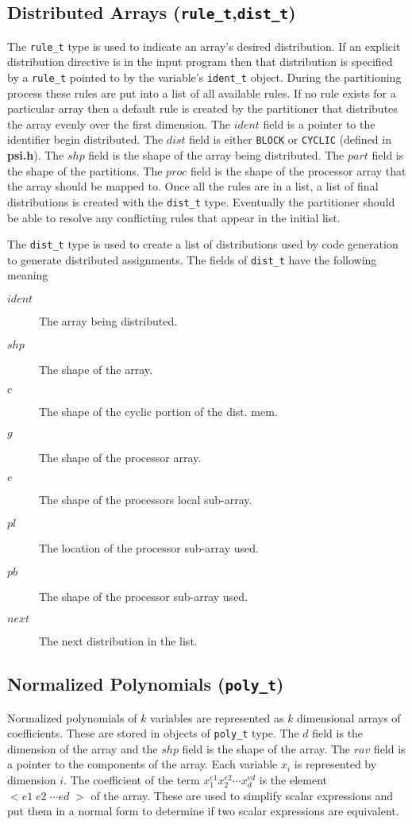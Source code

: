 \subsection{Distributed Arrays ({\tt rule\_t},{\tt dist\_t})}
The {\tt rule\_t} type is used to indicate an array's desired distribution.  If
an explicit distribution directive is in the input program then that 
distribution is specified by a {\tt rule\_t} pointed to by the variable's
{\tt ident\_t} object.  During the partitioning process these rules are put into
a list of all available rules.  If no rule exists for a particular array
then a default rule is created by the partitioner that distributes the 
array evenly over the first dimension.  The $ident$ field is a pointer
to the identifier begin distributed.  The $dist$ field is either {\tt BLOCK}
or {\tt CYCLIC} (defined in {\bf psi.h}).  The $shp$ field is the shape of the
array being distributed.  The $part$ field is the shape of the partitions.
The $proc$ field is the shape of the processor array that the array should
be mapped to.  Once all the rules are in
a list, a list of final distributions is created with the {\tt dist\_t} type.
Eventually the partitioner should be able to resolve any conflicting rules
that appear in the initial list.

The {\tt dist\_t} type is used to create a list of distributions used by code 
generation to generate distributed assignments.  The fields of {\tt dist\_t}
have the following meaning

\begin{description}
\item[$ident$] The array being distributed.
\item[$shp$] The shape of the array.
\item[$c$] The shape of the cyclic portion of the dist. mem.
\item[$g$] The shape of the processor array.
\item[$e$] The shape of the processors local sub-array.
\item[$pl$] The location of the processor sub-array used.
\item[$pb$] The shape of the processor sub-array used.
\item[$next$] The next distribution in the list.
\end{description}

\subsection{Normalized Polynomials ({\tt poly\_t})}
Normalized polynomials of $k$ variables are represented as
$k$ dimensional arrays of coefficients.  These are stored in objects of
{\tt poly\_t} type.  The $d$ field is the dimension of the array and the $shp$
field is the shape of the array.  The $rav$ field is a pointer to the
components of the array.  Each variable $x_{i}$ is represented by dimension
$i$.  The coefficient of the term $x_{1}^{e1}x_{2}^{e2}\cdots x_{d}^{ed}$
is the element $<e1\; e2\; \cdots ed\; >$ of the array.  These are used
to simplify scalar expressions and put them in a normal form to determine
if two scalar expressions are equivalent.

